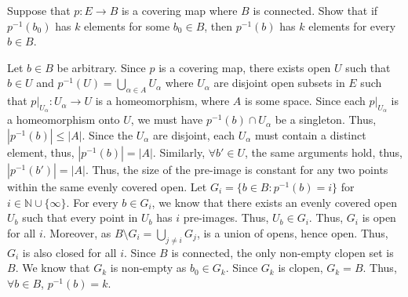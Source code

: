 \documentclass[12pt]{article}
\begin{document}
\begin{problem}{5}
Suppose that \( p : E \to B \) is a covering map where \( B \) is connected. Show that if \( p^{-1}(b_0) \) has \( k \) elements for some \( b_0 \in B \), then \( p^{-1}(b) \) has \( k \) elements for every \( b \in B \).
\end{problem}
\begin{solution}
    Let $b \in B$ be arbitrary. Since $p$ is a covering map, there exists open $U$ such that $b \in U$ and $p^{-1}(U) = \bigcup_{\alpha \in A} U_\alpha$ where $U_\alpha$ are disjoint open subsets in $E$ such that $p|_{U_\alpha}: U_\alpha \to U$ is a homeomorphism, where $A$ is some space. Since each $p|_{U_\alpha}$ is a homeomorphism onto $U$, we must have $p^{-1}(b) \cap U_\alpha$ be a singleton. Thus, $|p^{-1}(b)| \leq |A|$. Since the $U_\alpha$ are disjoint, each $U_\alpha$ must contain a distinct element, thus, $|p^{-1}(b)| = |A|$. Similarly, $\forall b' \in U$, the same arguments hold, thus, $|p^{-1}(b')| = |A|$. Thus, the size of the pre-image is constant for any two points within the same evenly covered open. \bbni
    Let $G_i = \{b \in B : p^{-1}(b) = i\}$ for $i \in \mathbb{N} \cup \{\infty\}$. For every $b \in G_i$, we know that there exists an evenly covered open $U_b$ such that every point in $U_b$ has $i$ pre-images. Thus, $U_b \in G_i$. Thus, $G_i$ is open for all $i$. Moreover, as $B \setminus G_i = \bigcup_{j \neq i} G_j$, is a union of opens, hence open. Thus, $G_i$ is also closed for all $i$. \bbni
    Since $B$ is connected, the only non-empty clopen set is $B$. We know that $G_k$ is non-empty as $b_0 \in G_k$. Since $G_k$ is clopen, $G_k = B$. Thus, $\forall b \in B$, $p^{-1}(b) = k$.
\end{solution}
\newpage
\end{document}
